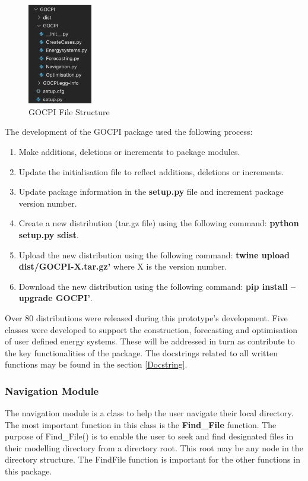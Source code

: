 \documentclass[12pt]{article}
\begin{document}
\begin{figure}
	\centering
	\includegraphics[width = 0.25\textwidth]{GOCPI-package-structure}
	\caption{GOCPI File Structure}
	\label{fig:GPS}
\end{figure}

The development of the GOCPI package used the following process:
\begin{enumerate}
	\item Make additions, deletions or increments to package modules.
	\item Update the initialisation file to reflect additions, deletions or increments.
	\item Update package information in the \textbf{setup.py} file and increment package version number.
	\item Create a new distribution (tar.gz file) using the following command: \textbf{python setup.py sdist}.
	\item Upload the new distribution using the following command: \textbf{twine upload dist/GOCPI-X.tar.gz'} where X is the version number.
	\item Download the new distribution using the following command: \textbf{pip install --upgrade GOCPI'}.
\end{enumerate}

Over 80 distributions were released during this prototype's development. 
Five classes were developed to support the construction, forecasting and optimisation of user defined energy systems.
These will be addressed in turn as contribute to the key functionalities of the package.
The docstrings related to all written functions may be found in the section \ref{Docstring}.

\subsubsection{Navigation Module}
The navigation module is a class to help the user navigate their local directory. 
The most important function in this class is the \textbf{Find\_File} function.
The purpose of Find\_File() is to enable the user to seek and find designated files in their modelling directory from a directory root.
This root may be any node in the directory structure. 
The FindFile function is important for the other functions in this package.
\end{document}
